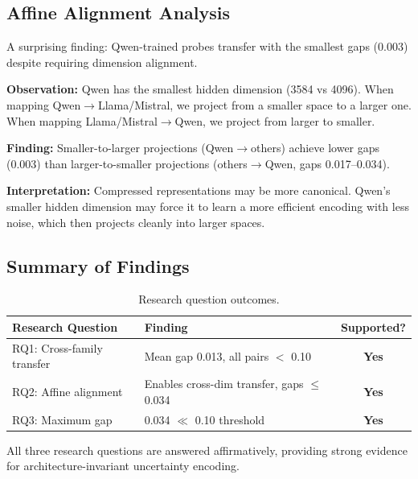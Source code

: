\subsection{Affine Alignment Analysis}

A surprising finding: Qwen-trained probes transfer with the smallest gaps (0.003) despite requiring dimension alignment.

\textbf{Observation:} Qwen has the smallest hidden dimension (3584 vs 4096). When mapping Qwen$\to$Llama/Mistral, we project from a smaller space to a larger one. When mapping Llama/Mistral$\to$Qwen, we project from larger to smaller.

\textbf{Finding:} Smaller-to-larger projections (Qwen$\to$others) achieve lower gaps (0.003) than larger-to-smaller projections (others$\to$Qwen, gaps 0.017--0.034).

\textbf{Interpretation:} Compressed representations may be more canonical. Qwen's smaller hidden dimension may force it to learn a more efficient encoding with less noise, which then projects cleanly into larger spaces.

\subsection{Summary of Findings}

\begin{table}[h]
\centering
\caption{Research question outcomes.}
\label{tab:rqs}
\begin{tabular}{@{}llc@{}}
\toprule
Research Question & Finding & Supported? \\
\midrule
RQ1: Cross-family transfer & Mean gap 0.013, all pairs $<$ 0.10 & \textbf{Yes} \\
RQ2: Affine alignment & Enables cross-dim transfer, gaps $\leq$ 0.034 & \textbf{Yes} \\
RQ3: Maximum gap & 0.034 $\ll$ 0.10 threshold & \textbf{Yes} \\
\bottomrule
\end{tabular}
\end{table}

All three research questions are answered affirmatively, providing strong evidence for architecture-invariant uncertainty encoding.
